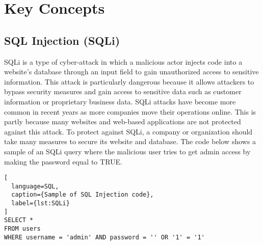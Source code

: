 \section{Key Concepts}
\label{sec:prerequisites}


\subsection{SQL Injection (SQLi)}
\label{subsec:SQLi}
\par SQLi is a type of cyber-attack in which a malicious actor injects code into a website's database through an input field to gain unauthorized access to sensitive information. This attack is particularly dangerous because it allows attackers to bypass security measures and gain access to sensitive data such as customer information or proprietary business data. SQLi attacks have become more common in recent years as more companies move their operations online. This is partly because many websites and web-based applications are not protected against this attack. To protect against SQLi, a company or organization should take many measures to secure its website and database. The code below shows a sample of an SQLi query where the malicious user tries to get admin access by making the password equal to TRUE.

\begin{lstlisting}[
  language=SQL,
  caption={Sample of SQL Injection code},
  label={lst:SQLi}
]
SELECT * 
FROM users 
WHERE username = 'admin' AND password = '' OR '1' = '1'
\end{lstlisting}


